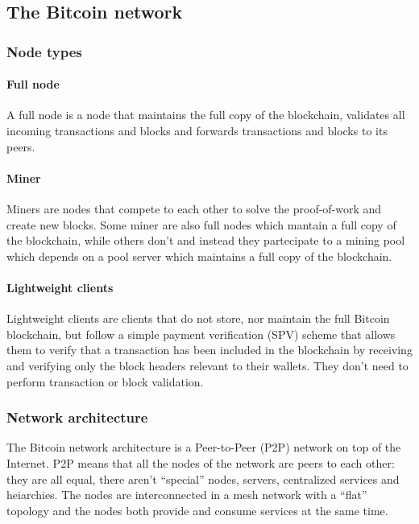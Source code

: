 \subsection{The Bitcoin network}

\subsubsection{Node types}
\paragraph{Full node} A full node is a node that maintains the full copy of the
blockchain, validates all incoming transactions and blocks and forwards
transactions and blocks to its peers.

\paragraph{Miner} Miners are nodes that compete to each other to solve the
proof-of-work and create new blocks. Some miner are also full nodes which
mantain a full copy of the blockchain, while others don't and instead they
partecipate to a mining pool which depends on a pool server which maintains a
full copy of the blockchain.

\paragraph{Lightweight clients} Lightweight clients are clients that do not
store, nor maintain the full Bitcoin blockchain, but follow a simple payment
verification (SPV) scheme that allows them to verify that a transaction has been
included in the blockchain by receiving and verifying only the block headers
relevant to their wallets. They don't need to perform transaction or block
validation.

\subsubsection{Network architecture}
The Bitcoin network architecture is a Peer-to-Peer (P2P) network on top of the
Internet. P2P means that all the nodes of the network are peers to each other:
they are all equal, there aren't ``special'' nodes, servers, centralized services
and heiarchies. The nodes are interconnected in a mesh network with a ``flat''
topology and the nodes both provide and consume services at the same time.  









